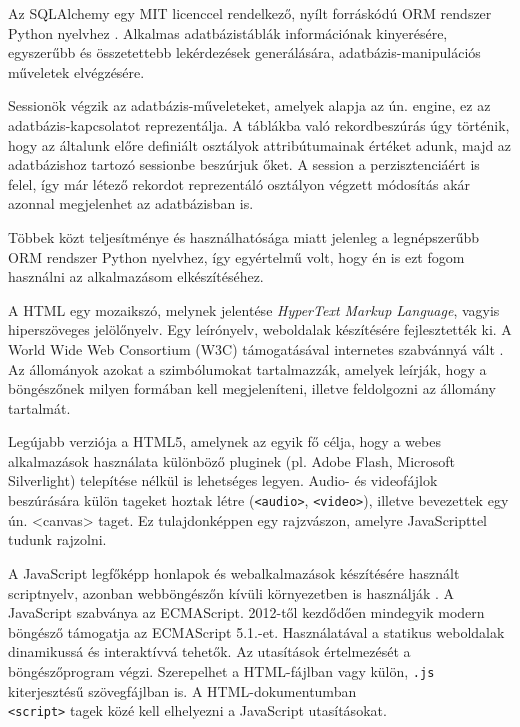
Az SQLAlchemy egy MIT licenccel rendelkező, nyílt forráskódú ORM rendszer Python nyelvhez \cite{sqlalchemy}. Alkalmas adatbázistáblák információnak kinyerésére, egyszerűbb és összetettebb lekérdezések generálására, adatbázis-manipulációs műveletek elvégzésére.

Sessionök végzik az adatbázis-műveleteket, amelyek alapja az ún. engine, ez az adatbázis-kapcsolatot reprezentálja. A táblákba való rekordbeszúrás úgy történik, hogy az általunk előre definiált osztályok attribútumainak értéket adunk, majd az adatbázishoz tartozó sessionbe beszúrjuk őket. A session a perzisztenciáért is felel, így már létező rekordot reprezentáló osztályon végzett módosítás akár azonnal megjelenhet az adatbázisban is.

Többek közt teljesítménye és használhatósága miatt jelenleg a legnépszerűbb ORM rendszer Python nyelvhez, így egyértelmű volt, hogy én is ezt fogom használni az alkalmazásom elkészítéséhez. 


A HTML egy mozaikszó, melynek jelentése \textit{HyperText Markup Language}, vagyis hiperszöveges jelölőnyelv. Egy leírónyelv, weboldalak készítésére fejlesztették ki. A World Wide Web Consortium (W3C) támogatásával internetes szabvánnyá vált \cite{html}. Az állományok azokat a szimbólumokat tartalmazzák, amelyek leírják, hogy a böngészőnek milyen formában kell megjeleníteni, illetve feldolgozni az állomány tartalmát.

Legújabb verziója a HTML5, amelynek az egyik fő célja, hogy a webes alkalmazások használata különböző pluginek (pl. Adobe Flash, Microsoft Silverlight) telepítése nélkül is lehetséges legyen. Audio- és videofájlok beszúrására külön tageket hoztak létre (\texttt{<audio>}, \texttt{<video>}), illetve bevezettek egy ún. <canvas> taget. Ez tulajdonképpen egy rajzvászon, amelyre JavaScripttel tudunk rajzolni.


A JavaScript legfőképp honlapok és webalkalmazások készítésére használt scriptnyelv, azonban webböngészőn kívüli környezetben is használják \cite{javascript}. A JavaScript szabványa az ECMAScript. 2012-től kezdődően mindegyik modern böngésző támogatja az ECMAScript 5.1.-et. Használatával a statikus weboldalak dinamikussá és interaktívvá tehetők. Az utasítások értelmezését a böngészőprogram végzi. Szerepelhet a HTML-fájlban vagy külön, \texttt{.js} kiterjesztésű szövegfájlban is. A HTML-dokumentumban \\ \texttt{<script>} tagek közé kell elhelyezni a JavaScript utasításokat.

